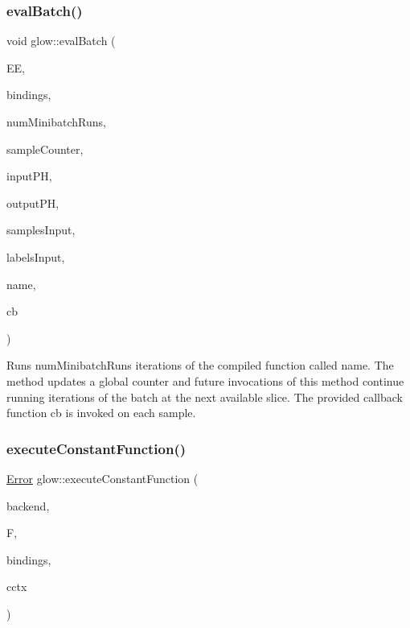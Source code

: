 \subsubsection{\texorpdfstring{eval\+Batch()}{evalBatch()}}
{\footnotesize\ttfamily void glow\+::eval\+Batch (\begin{DoxyParamCaption}\item[{\hyperlink{classglow_1_1_execution_engine}{Execution\+Engine} \&}]{EE,  }\item[{\hyperlink{classglow_1_1_placeholder_bindings}{Placeholder\+Bindings} \&}]{bindings,  }\item[{size\+\_\+t}]{num\+Minibatch\+Runs,  }\item[{size\+\_\+t \&}]{sample\+Counter,  }\item[{\hyperlink{classglow_1_1_placeholder}{Placeholder} $\ast$}]{input\+PH,  }\item[{\hyperlink{classglow_1_1_placeholder}{Placeholder} $\ast$}]{output\+PH,  }\item[{\hyperlink{classglow_1_1_tensor}{Tensor} \&}]{samples\+Input,  }\item[{\hyperlink{classglow_1_1_tensor}{Tensor} \&}]{labels\+Input,  }\item[{llvm\+::\+String\+Ref}]{name,  }\item[{std\+::function$<$ void(const \hyperlink{classglow_1_1_tensor}{Tensor} \&sample\+In, const \hyperlink{classglow_1_1_tensor}{Tensor} \&sample\+Out, const \hyperlink{classglow_1_1_tensor}{Tensor} \&label, size\+\_\+t sample\+Index)$>$ \&\&}]{cb }\end{DoxyParamCaption})}

Runs {\ttfamily num\+Minibatch\+Runs} iterations of the compiled function called {\ttfamily name}. The method updates a global counter and future invocations of this method continue running iterations of the batch at the next available slice. The provided callback function {\ttfamily cb} is invoked on each sample. \mbox{\label{namespaceglow_a6bf1f1f5a7c61022904299bfeee07b34}} 
\subsubsection{\texorpdfstring{execute\+Constant\+Function()}{executeConstantFunction()}}
{\footnotesize\ttfamily \hyperlink{namespaceglow_afdb176c3a672ef66db0ecfc19a8d39bf}{Error} glow\+::execute\+Constant\+Function (\begin{DoxyParamCaption}\item[{\hyperlink{classglow_1_1_backend}{Backend} \&}]{backend,  }\item[{\hyperlink{classglow_1_1_function}{Function} \&}]{F,  }\item[{\hyperlink{classglow_1_1_placeholder_bindings}{Placeholder\+Bindings} \&}]{bindings,  }\item[{\hyperlink{structglow_1_1_compilation_context}{Compilation\+Context} \&}]{cctx }\end{DoxyParamCaption})}


